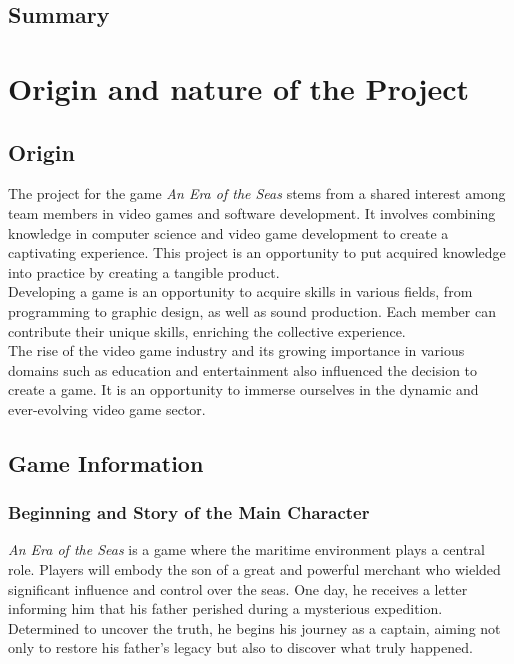 \documentclass{article}
\begin{document}
\newpage
\subsection*{Summary}
\tableofcontents















\newpage
\section{Origin and nature of the Project}
\subsection{Origin}\hfill

The project for the game \textit{An Era of the Seas} stems from a shared interest among team members in video games and software development. It involves combining knowledge in computer science and video game development to create a captivating experience. This project is an opportunity to put acquired knowledge into practice by creating a tangible product.\\

Developing a game is an opportunity to acquire skills in various fields, from programming to graphic design, as well as sound production. Each member can contribute their unique skills, enriching the collective experience.\\

The rise of the video game industry and its growing importance in various domains such as education and entertainment also influenced the decision to create a game. It is an opportunity to immerse ourselves in the dynamic and ever-evolving video game sector.





\subsection{Game Information} 
\subsubsection{Beginning and Story of the Main Character}\hfill

\textit{An Era of the Seas} is a game where the maritime environment plays a central role. Players will embody the son of a great and powerful merchant who wielded significant influence and control over the seas. One day, he receives a letter informing him that his father perished during a mysterious expedition. Determined to uncover the truth, he begins his journey as a captain, aiming not only to restore his father’s legacy but also to discover what truly happened.\\
\end{document}
